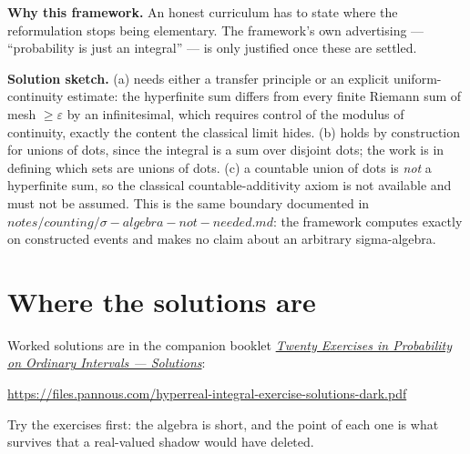 \documentclass[11pt]{article}
\newcommand{\eps}{\varepsilon}
\begin{document}
\textbf{Why this framework.} An honest curriculum has to state where the
reformulation stops being elementary. The framework's own advertising ---
``probability is just an integral'' --- is only justified once these are settled.

\textbf{Solution sketch.} (a) needs either a transfer principle or an explicit
uniform-continuity estimate: the hyperfinite sum differs from every finite
Riemann sum of mesh $\ge  \eps$ by an infinitesimal, which requires control of
the modulus of continuity, exactly the content the classical limit hides.
(b) holds by construction for unions of dots, since the integral is a sum over
disjoint dots; the work is in defining which sets are unions of dots.
(c) a countable union of dots is \emph{not} a hyperfinite sum, so the classical
countable-additivity axiom is not available and must not be assumed. This is
the same boundary documented in $notes/counting/\sigma-algebra-not-needed.md$:
the framework computes exactly on constructed events and makes no claim about
an arbitrary sigma-algebra.


\section*{Where the solutions are}

Worked solutions are in the companion booklet
\href{https://files.pannous.com/hyperreal-integral-exercise-solutions-dark.pdf}{\emph{Twenty Exercises in Probability on Ordinary Intervals --- Solutions}}:
\begin{center}\small\url{https://files.pannous.com/hyperreal-integral-exercise-solutions-dark.pdf}\end{center}
Try the exercises first: the algebra is short, and the point of each one is
what survives that a real-valued shadow would have deleted.
\end{document}
